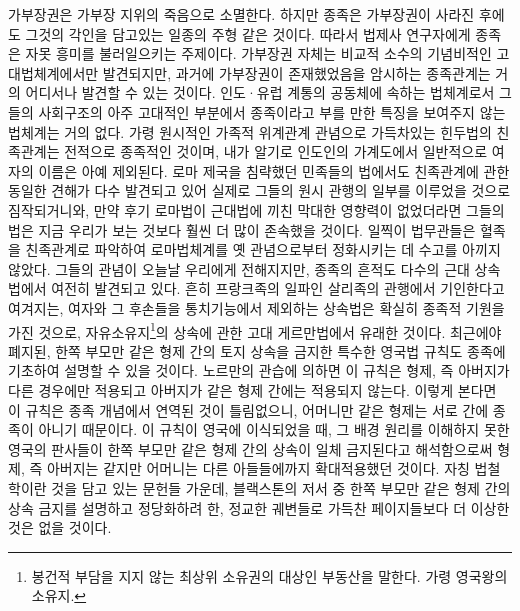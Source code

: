 가부장권은 가부장 지위의 죽음으로 소멸한다.
하지만 종족은 가부장권이 사라진 후에도 그것의 각인을 담고있는
일종의 주형 같은 것이다.
따라서 법제사 연구자에게 종족은 자못 흥미를 불러일으키는 주제이다.
가부장권 자체는 비교적 소수의 기념비적인 고대법체계에서만 발견되지만,
과거에 가부장권이 존재했었음을 암시하는 종족관계는
거의 어디서나 발견할 수 있는 것이다.
인도^^b7유럽 계통의 공동체에 속하는 법체계로서
그들의 사회구조의 아주 고대적인 부분에서
종족이라고 부를 만한 특징을 보여주지 않는 법체계는 거의 없다.
가령
원시적인 가족적 위계관계 관념으로 가득차있는
힌두법의 친족관계는 전적으로 종족적인 것이며,
내가 알기로 인도인의 가계도에서 일반적으로 여자의 이름은 아예 제외된다.
로마 제국을 침략했던 민족들의 법에서도
친족관계에 관한 동일한 견해가 다수 발견되고 있어
실제로
그들의 원시 관행의 일부를 이루었을 것으로 짐작되거니와,
만약 후기 로마법이 근대법에 끼친 막대한 영향력이 없었더라면
그들의 법은 지금 우리가 보는 것보다 훨씬 더 많이 존속했을 것이다.
일찍이 법무관들은 혈족을  친족관계로 파악하여
로마법체계를 옛 관념으로부터 정화시키는 데 수고를 아끼지 않았다.
그들의 관념이 오늘날 우리에게 전해지지만,
종족의 흔적도 다수의 근대 상속법에서 여전히 발견되고 있다.
흔히 프랑크족의 일파인 살리족의 관행에서
기인한다고 여겨지는,
여자와 그 후손들을 통치기능에서 제외하는 상속법은
확실히 종족적 기원을 가진 것으로,
자유소유지\footnote{봉건적 부담을 지지 않는
최상위 소유권의 대상인 부동산을 말한다. 가령 영국왕의 소유지.}의 상속에 관한
고대 게르만법에서 유래한 것이다.
최근에야 폐지된,
한쪽 부모만 같은 형제 간의 토지 상속을 금지한
특수한 영국법 규칙도 종족에 기초하여 설명할 수 있을 것이다.
노르만의 관습에 의하면
이 규칙은  형제,
즉 아버지가 다른 경우에만 적용되고
아버지가 같은 형제 간에는 적용되지 않는다.
이렇게 본다면 이 규칙은 종족 개념에서 연역된 것이 틀림없으니,
어머니만 같은 형제는 서로 간에 종족이 아니기 때문이다.
이 규칙이 영국에 이식되었을 때,
그 배경 원리를 이해하지 못한 영국의 판사들이
한쪽 부모만 같은 형제 간의 상속이 일체 금지된다고 해석함으로써
 형제,
즉 아버지는 같지만 어머니는 다른 아들들에까지 확대적용했던 것이다.
자칭 법철학이란 것을 담고 있는 문헌들 가운데,
블랙스톤의 저서 중
한쪽 부모만 같은 형제 간의 상속 금지를 설명하고 정당화하려 한,
정교한 궤변들로 가득찬 페이지들보다 더 이상한 것은 없을 것이다.


